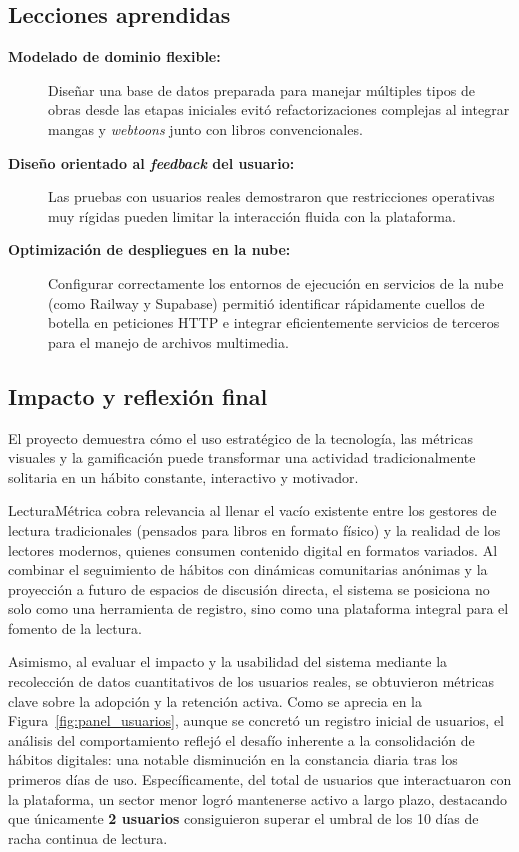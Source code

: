 \documentclass[12pt, atypical, journal]{article}
\begin{document}
\subsection{Lecciones aprendidas}
\begin{description}
	\item[\textbf{Modelado de dominio flexible:}] 
	Diseñar una base de datos preparada para manejar múltiples tipos de obras desde las etapas iniciales evitó refactorizaciones complejas al integrar mangas y \textit{webtoons} junto con libros convencionales.
	
	\item[\textbf{Diseño orientado al \textit{feedback} del usuario:}] 
	Las pruebas con usuarios reales demostraron que restricciones operativas muy rígidas pueden limitar la interacción fluida con la plataforma.
	
	\item[\textbf{Optimización de despliegues en la nube:}] 
	Configurar correctamente los entornos de ejecución en servicios de la nube (como Railway y Supabase) permitió identificar rápidamente cuellos de botella en peticiones HTTP e integrar eficientemente servicios de terceros para el manejo de archivos multimedia.
\end{description}

\subsection{Impacto y reflexión final}

El proyecto demuestra cómo el uso estratégico de la tecnología, las métricas visuales y la gamificación puede transformar una actividad tradicionalmente solitaria en un hábito constante, interactivo y motivador.

LecturaMétrica cobra relevancia al llenar el vacío existente entre los gestores de lectura tradicionales (pensados para libros en formato físico) y la realidad de los lectores modernos, quienes consumen contenido digital en formatos variados. Al combinar el seguimiento de hábitos con dinámicas comunitarias anónimas y la proyección a futuro de espacios de discusión directa, el sistema se posiciona no solo como una herramienta de registro, sino como una plataforma integral para el fomento de la lectura.

Asimismo, al evaluar el impacto y la usabilidad del sistema mediante la recolección de datos cuantitativos de los usuarios reales, se obtuvieron métricas clave sobre la adopción y la retención activa. Como se aprecia en la Figura~\ref{fig:panel_usuarios}, aunque se concretó un registro inicial de usuarios, el análisis del comportamiento reflejó el desafío inherente a la consolidación de hábitos digitales: una notable disminución en la constancia diaria tras los primeros días de uso. Específicamente, del total de usuarios que interactuaron con la plataforma, un sector menor logró mantenerse activo a largo plazo, destacando que únicamente \textbf{2 usuarios} consiguieron superar el umbral de los 10 días de racha continua de lectura. 
\end{document}
